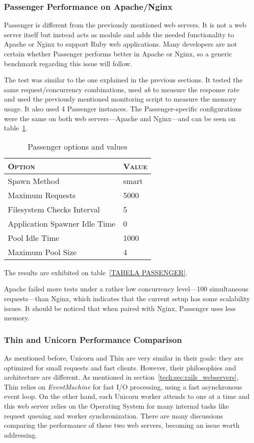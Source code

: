 \subsubsection{Passenger Performance on Apache/Nginx}
Passenger is different from the previously mentioned web servers. It is not a web server itself but instead acts as module and adds the needed functionality to Apache or Nginx to support Ruby web applications. Many developers are not certain whether Passenger performs better in Apache or Nginx, so a generic benchmark regarding this issue will follow.

The test was similar to the one explained in the previous sections. It tested the same request/concurrency combinations, used \textit{ab} to measure the response rate and used the previously mentioned monitoring script to measure the memory usage. It also used 4 Passenger instances. The Passenger-specific configurations were the same on both web servers---Apache and Nginx---and can be seen on table~\ref{tab:passenger4_configuration}.
\begin{table}[ht]
  \centering
  
  \begin{tabular}{p{}|p{}}
    \textsc{Option}
  & \textsc{Value} \\
  \hline
  Spawn Method & smart \\
  Maximum Requests & 5000 \\
  Filesystem Checks Interval & 5 \\
  Application Spawner Idle Time & 0 \\
  Pool Idle Time & 1000 \\
  Maximum Pool Size & 4 \\
  
  \end{tabular}
  \caption{Passenger options and values}
  \label{tab:passenger4_configuration}
\end{table}
The results are exhibited on table~\ref{TABELA PASSENGER}.

Apache failed more tests under a rather low concurrency level---100 simultaneous requests---than Nginx, which indicates that the current setup has some scalability issues. It should be noticed that when paired with Nginx, Passenger uses less memory. 

\subsubsection{Thin and Unicorn Performance Comparison}
As mentioned before, Unicorn and Thin are very similar in their goals: they are optimized for small requests and fast clients. However, their philosophies and architecture are different. As mentioned in section~\ref{tech:sec:rails_webservers}, Thin relies on \textit{EventMachine} for fast I/O processing, using a fast asynchronous event loop. On the other hand, each Unicorn worker attends to one at a time and this web server relies on the Operating System for many internal tasks like request queuing and worker synchronization. There are many discussions comparing the performance of these two web servers, becoming an issue worth addressing.

